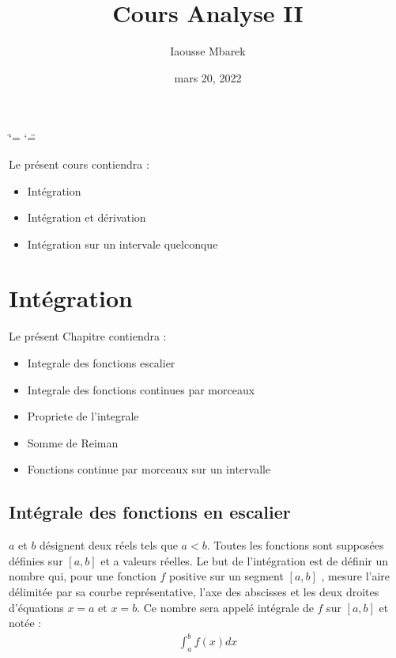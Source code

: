 \documentclass[letterpaper,10pt,french]{sphinxmanual}
\title{Cours Analyse II}
\date{mars 20, 2022}
\author{Iaousse M\textquotesingle{}barek}
\begin{document}
\ifdefined\shorthandoff
  \ifnum\catcode`\=\string=\active\shorthandoff{=}\fi
  \ifnum\catcode`\"=\active{}\fi
\fi

\pagestyle{empty}
\sphinxmaketitle
\pagestyle{plain}
\sphinxtableofcontents
\pagestyle{normal}
\label{\detokenize{intro::doc}}


\sphinxAtStartPar
Le présent cours contiendra :
\begin{itemize}
\item {} 
\sphinxAtStartPar
Intégration

\item {} 
\sphinxAtStartPar
Intégration et dérivation

\item {} 
\sphinxAtStartPar
Intégration sur un intervale quelconque

\end{itemize}


\chapter{Intégration}
\label{\detokenize{integration:integration}}\label{\detokenize{integration::doc}}
\sphinxAtStartPar
Le présent Chapitre contiendra :
\begin{itemize}
\item {} 
\sphinxAtStartPar
Integrale des fonctions escalier

\item {} 
\sphinxAtStartPar
Integrale des fonctions continues par morceaux

\item {} 
\sphinxAtStartPar
Propriete de l’integrale

\item {} 
\sphinxAtStartPar
Somme de Reiman

\item {} 
\sphinxAtStartPar
Fonctions continue par morceaux sur un intervalle

\end{itemize}


\section{Intégrale des fonctions en escalier}
\label{\detokenize{fe:integrale-des-fonctions-en-escalier}}\label{\detokenize{fe::doc}}
\sphinxAtStartPar
\(a\) et \(b\) désignent deux réels tels que \(a < b \). Toutes    les fonctions sont supposées définies sur \([a, b]\) et a valeurs réelles.
Le but de l’intégration est de définir un nombre qui, pour une fonction \(f\) positive sur un segment \([a, b]\) , mesure l’aire délimitée par sa courbe représentative, l’axe des abscisses et les deux droites d’équations \(x = a\) et \(x = b\).
Ce nombre sera appelé intégrale de \(f\) sur \([a, b]\) et notée :
\begin{equation*}
\begin{split}
\int_a^b f(x)dx
\end{split}
\end{equation*}
\end{document}
